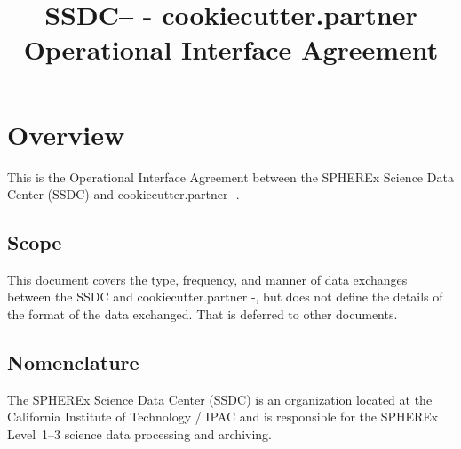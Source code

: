 \documentclass[IF]{spherex}
\title{SSDC-- {{- cookiecutter.partner }} Operational Interface Agreement}
\begin{document}
\maketitle

\begin{dochistory}
\end{dochistory}


\section{Overview}

This is the Operational Interface Agreement between the SPHEREx Science Data Center (SSDC)
and {{ cookiecutter.partner -}}.

\subsection{Scope}


This document covers the type, frequency, and manner of data exchanges between
the SSDC and {{ cookiecutter.partner -}}, but does not define the details of
the format of the data exchanged.
That is deferred to other documents.


\subsection{Nomenclature}

The SPHEREx Science Data Center (SSDC) is an organization located at
the California Institute of Technology / IPAC and is responsible for the
SPHEREx Level~1--3 science data processing and archiving.

\end{document}
